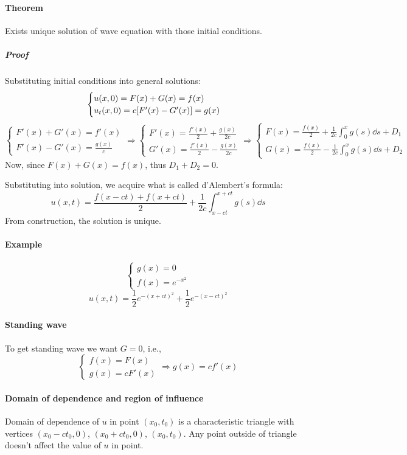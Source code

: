 \paragraph{Theorem}
Exists unique solution of wave equation with those initial conditions. 
\subparagraph{Proof}
Substituting initial conditions into general solutions:
$$\begin{cases}
u(x,0) = F(x) + G(x) = f(x)\\
u_t(x,0) = c\qty[F'(x) - G'(x) ] = g(x)
\end{cases}$$
$$\begin{cases}
F'(x) + G'(x) = f'(x)\\
F'(x) - G'(x)  = \frac{g(x)}{c}
\end{cases} \Rightarrow \begin{cases}
F'(x) = \frac{f'(x) }{2} + \frac{g(x)}{2c}\\
G'(x)  = \frac{f'(x) }{2} - \frac{g(x)}{2c}
\end{cases} \Rightarrow \begin{cases}
F(x) = \frac{f(x) }{2} + \frac{1}{2c}\int_0^x g(s) \dd{s} + D_1\\
G(x)  = \frac{f(x) }{2} - \frac{1}{2c}\int_0^x g(s) \dd{s} + D_2
\end{cases}$$
Now, since $F(x)+G(x) = f(x)$, thus $D_1 + D_2 = 0$.

Substituting into solution, we acquire what is called d'Alembert's formula:
$$u(x,t) = \frac{f(x-ct) + f(x+ct) }{2} + \frac{1}{2c}\int_{x-ct}^{x+ct} g(s) \dd{s} $$
From construction, the solution is unique.
\paragraph{Example}
$$\begin{cases}
g(x) = 0 \\
f(x) = e^{-x^2}
\end{cases}$$
$$u(x,t) = \frac{1}{2} e^{-(x+ct)^2} + \frac{1}{2}e^{-(x-ct)^2} $$
\paragraph{Standing wave}
To get standing wave we want $G=0$, i.e., 
$$\begin{cases}
f(x) = F(x)\\
g(x) = cF'(x)
\end{cases} \Rightarrow g(x) = cf'(x)$$
\paragraph{Domain of dependence and region of influence}
Domain of dependence of $u$ in point $(x_0,t_0)$ is a characteristic triangle with vertices $(x_0-ct_0,0)$, $(x_0+ct_0, 0)$, $(x_0,t_0)$. Any point outside of triangle doesn't affect the value of $u$ in point.

